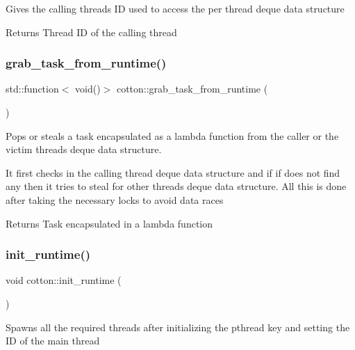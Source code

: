 Gives the calling thread\textquotesingle{}s ID used to access the per thread deque data structure

\begin{DoxyReturn}{Returns}
Thread ID of the calling thread 
\end{DoxyReturn}
\mbox{\label{namespacecotton_afaca8aa46092d066bf1d996ae09fb83d}} 
\subsubsection{\texorpdfstring{grab\+\_\+task\+\_\+from\+\_\+runtime()}{grab\_task\_from\_runtime()}}
{\footnotesize\ttfamily std\+::function$<$ void()$>$ cotton\+::grab\+\_\+task\+\_\+from\+\_\+runtime (\begin{DoxyParamCaption}{ }\end{DoxyParamCaption})}

Pops or steals a task encapsulated as a lambda function from the caller or the victim thread\textquotesingle{}s deque data structure.

It first checks in the calling thread deque data structure and if if does not find any then it tries to steal for other threads\textquotesingle{} deque data structure. All this is done after taking the necessary locks to avoid data races

\begin{DoxyReturn}{Returns}
Task encapsulated in a lambda function 
\end{DoxyReturn}
\mbox{\label{namespacecotton_ae391d31cf35efbf9e644206001d7fc6d}} 
\subsubsection{\texorpdfstring{init\+\_\+runtime()}{init\_runtime()}}
{\footnotesize\ttfamily void cotton\+::init\+\_\+runtime (\begin{DoxyParamCaption}{ }\end{DoxyParamCaption})}

Spawns all the required threads after initializing the pthread key and setting the ID of the main thread

